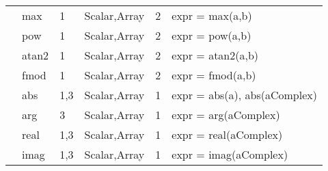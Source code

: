 \begin{center}
\begin{tabular}{|l|l|l|l|l|l}
                  &    max      &   1          &   Scalar,Array   &   2   &   expr = max(a,b) \\
                  &    pow      &   1          &   Scalar,Array   &   2   &   expr = pow(a,b) \\
                  &    atan2    &   1          &   Scalar,Array   &   2   &   expr = atan2(a,b) \\
                  &    fmod     &   1          &   Scalar,Array   &   2   &   expr = fmod(a,b) \\
                  &    abs      &   1,3        &   Scalar,Array   &   1   &   expr = abs(a), abs(aComplex) \\
                  &    arg      &   3          &   Scalar,Array   &   1   &   expr = arg(aComplex) \\
                  &    real     &   1,3        &   Scalar,Array   &   1   &   expr = real(aComplex) \\
                  &    imag     &   1,3        &   Scalar,Array   &   1   &   expr = imag(aComplex) \\
\hline
\end{tabular}
\end{center}



